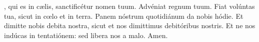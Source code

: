 , qui es in c{\ae}lis, sanctificétur nomen tuum. Advéniat regnum tuum.
Fiat volúntas tua, sicut in c{\oe}lo et in terra. Panem nóstrum quotidiánum da nobis hódie.
Et dimitte nobis debita nostra, sicut et nos dimittimus debitóribus nostris.
Et ne nos indúcas in tentatiónem: sed libera nos a malo. Amen.